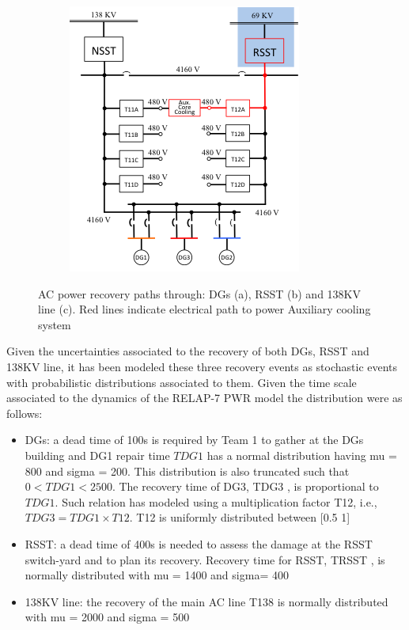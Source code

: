 \begin{figure}
\begin{subfigure}[b]{0.3\textwidth}
                \includegraphics[width=\textwidth]{figures/ACpowerRecPathRSST.png}
                \caption{}
                \label{fig:ACpowerRSST}
        \end{subfigure}
        \caption{AC power recovery paths through: DGs (a), RSST (b) and 138KV line (c). Red lines indicate electrical path to power Auxiliary cooling system}\label{fig:ACPowerRecovery}
\end{figure}

Given the uncertainties associated to the recovery of both DGs, RSST and 138KV line, it has been modeled these three recovery events as stochastic events with probabilistic distributions associated to them. Given the time scale associated to the dynamics of the RELAP-7 PWR model the distribution were as follows:
\begin{itemize}
\item DGs: a dead time of 100s is required by Team 1 to gather at the DGs building and DG1 repair time $TDG1$ has a normal distribution having mu = 800 and sigma = 200. This distribution is also truncated such that $0 < TDG1 < 2500$. The recovery time of DG3, TDG3 , is proportional to $TDG1$. Such relation has modeled using a multiplication factor T12, i.e., $TDG3 = TDG1\times T12$. T12 is uniformly distributed between [0.5 1]
\item RSST: a dead time of 400s is needed to assess the damage at the RSST switch-yard and to plan its recovery. Recovery time for RSST, TRSST , is normally distributed with mu = 1400 and sigma= 400
\item 138KV line: the recovery of the main AC line T138 is normally distributed with mu = 2000 and sigma = 500
\end{itemize}

